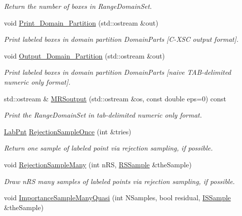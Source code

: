 \begin{DoxyCompactItemize}
\begin{DoxyCompactList}\small\item\em \-Return the number of boxes in \-Range\-Domain\-Set. \end{DoxyCompactList}\item 
void \hyperlink{classMRSampler_a92103320447370feb1f9452915534a91}{\-Print\-\_\-\-Domain\-\_\-\-Partition} (std\-::ostream \&out)
\begin{DoxyCompactList}\small\item\em \-Print labeled boxes in domain partition \-Domain\-Parts \mbox{[}\-C-\/\-X\-S\-C output format\mbox{]}. \end{DoxyCompactList}\item 
void \hyperlink{classMRSampler_a7c1905d15eef55fd405cf6e03550f6c1}{\-Output\-\_\-\-Domain\-\_\-\-Partition} (std\-::ostream \&out)
\begin{DoxyCompactList}\small\item\em \-Print labeled boxes in domain partition \-Domain\-Parts \mbox{[}naive \-T\-A\-B-\/delimited numeric only format\mbox{]}. \end{DoxyCompactList}\item 
std\-::ostream \& \hyperlink{classMRSampler_a7142c1478e259ec85354407fccfbfa78}{\-M\-R\-Soutput} (std\-::ostream \&os, const double eps=0) const 
\begin{DoxyCompactList}\small\item\em \-Print the \-Range\-Domain\-Set in tab-\/delimited numeric only format. \end{DoxyCompactList}\item 
\hyperlink{classLabPnt}{\-Lab\-Pnt} \hyperlink{classMRSampler_a3ab6aa3b0bb466c67c69db97e2dad5f2}{\-Rejection\-Sample\-Once} (int \&tries)
\begin{DoxyCompactList}\small\item\em \-Return one sample of labeled point via rejection sampling, if possible. \end{DoxyCompactList}\item 
void \hyperlink{classMRSampler_aac7c2e726a813ad155151c99cbdb7f12}{\-Rejection\-Sample\-Many} (int n\-R\-S, \hyperlink{classRSSample}{\-R\-S\-Sample} \&the\-Sample)
\begin{DoxyCompactList}\small\item\em \-Draw n\-R\-S many samples of labeled points via rejection sampling, if possible. \end{DoxyCompactList}\item 
void \hyperlink{classMRSampler_a1e1e42a57421caa0b13b194372d0b067}{\-Importance\-Sample\-Many\-Quasi} (int \-N\-Samples, bool residual, \hyperlink{classISSample}{\-I\-S\-Sample} \&the\-Sample)

\end{DoxyCompactItemize}
